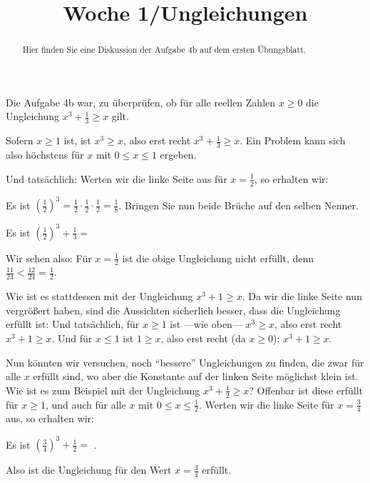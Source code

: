 \documentclass{ximera}
\title{Woche 1/Ungleichungen}
\begin{document}
\begin{abstract}
Hier finden Sie eine Diskussion der Aufgabe 4b auf dem ersten Übungsblatt.
\end{abstract}
\maketitle


Die Aufgabe 4b war, zu überprüfen, ob für alle reellen Zahlen $x\ge 0$ die Ungleichung $x^3 + \frac 13 \ge x$ gilt.

Sofern $x\ge 1$ ist, ist $x^3 \ge x$, also erst recht $x^3 + \frac 13 \ge x$. Ein Problem kann sich also höchstens für $x$ mit $0\le x\le 1$ ergeben.

\begin{question}
Und tatsächlich: Werten wir die linke Seite aus für $x = \frac 12$, so erhalten wir:
\begin{solution}
\begin{hint}
Es ist $\left(\frac 12\right)^3 = \frac 12 \cdot \frac 12\cdot \frac 12 = \frac 18$. Bringen Sie nun beide Brüche auf den selben Nenner.
\end{hint}
Es ist $\left(\frac 12\right)^3 + \frac 13=$ 
\end{solution}
\begin{solution}
Wir sehen also: Für $x= \frac 12$ ist die obige Ungleichung nicht erfüllt, denn $\frac{11}{24}< \frac{12}{24} = \frac 12$.
\end{solution}
\end{question}


Wie ist es stattdessen mit der Ungleichung $x^3 + 1 \ge x$. Da wir die linke Seite nun vergrößert haben, sind die Aussichten sicherlich besser, dass die Ungleichung erfüllt ist: Und tatsächlich, für $x\ge 1$ ist ---wie oben--- $x^3\ge x$, also erst recht $x^3+1\ge x$. Und für $x\le 1$ ist $1\ge x$, also erst recht (da $x\ge 0$): $x^3+1\ge x$.

\begin{question}
Nun könnten wir versuchen, noch ``bessere'' Ungleichungen zu finden, die zwar für alle $x$ erfüllt sind, wo aber die Konstante auf der linken Seite möglichst klein ist. Wie ist es zum Beispiel mit der Ungleichung $x^3 + \frac 12 \ge x$? Offenbar ist diese erfüllt für $x\ge 1$, und auch für alle $x$ mit $0\le x\le \frac 12$. Werten wir die linke Seite für $x=\frac 34$ aus, so erhalten wir:
\begin{solution}
Es ist $\left(\frac 34\right)^3 + \frac 12 =$ .
\end{solution}
\begin{solution}
Also ist die Ungleichung für den Wert $x = \frac 34$ erfüllt.
\end{solution}
\end{question}
\end{document}
